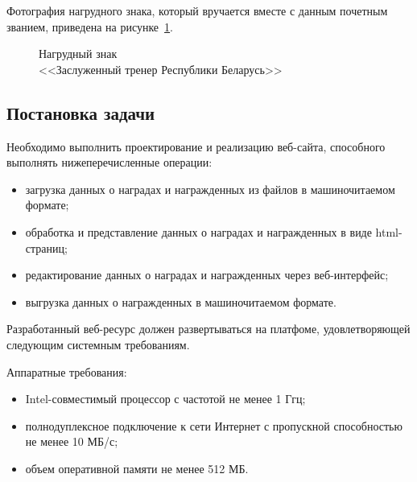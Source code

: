 Фотография нагрудного знака, 
который вручается вместе с данным почетным званием, 
приведена на рисунке~\ref{fig:trener_belarus}.

\begin{figure}[h]
  \centering
  {
    \setlength{\fboxsep}{0pt}%
    \setlength{\fboxrule}{1pt}%
  }
  \caption{Нагрудный знак \\ <<Заслуженный тренер Республики Беларусь>>}
  \label{fig:trener_belarus}
\end{figure}


\subsection{Постановка задачи}

Необходимо выполнить проектирование и реализацию веб-сайта, 
способного выполнять нижеперечисленные операции:

\begin{itemize}
\item загрузка данных о наградах и награжденных из файлов
  в машиночитаемом формате;
\item обработка и представление данных о наградах и награжденных
  в виде html-страниц;
\item редактирование данных о наградах и награжденных 
  через веб-интерфейс;
\item выгрузка данных о награжденных в машиночитаемом 
  формате.
\end{itemize}

Разработанный веб-ресурс должен развертываться на платфоме,
удовлетворяющей следующим системным требованиям.

Аппаратные требования:
\begin{itemize}
\item Intel-совместимый процессор с частотой не менее 1 Ггц;
\item полнодуплексное подключение к сети Интернет с
  пропускной способностью не менее 10 МБ/с;
\item объем оперативной памяти не менее 512 МБ.
\end{itemize}

